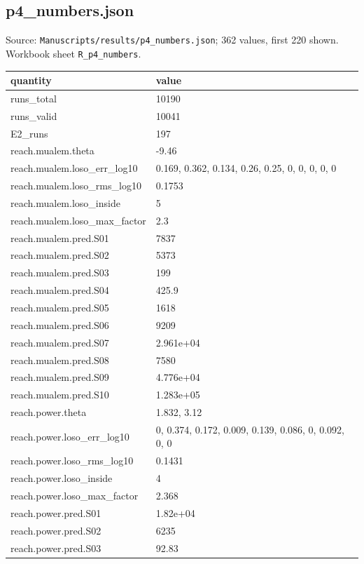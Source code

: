 \subsection*{p4\_numbers.json}
\noindent\small Source: \nolinkurl{Manuscripts/results/p4_numbers.json}; 362 values, first 220 shown. Workbook sheet \texttt{R\_p4\_numbers}.\par
{\scriptsize\begin{longtable}{p{}p{}}\toprule\textbf{quantity} & \textbf{value}\\\midrule\endhead
{}runs\_total & 10190\\
{}runs\_valid & 10041\\
{}E2\_runs & 197\\
{}reach.mualem.theta & -9.46\\
{}reach.mualem.loso\_err\_log10 & 0.169, 0.362, 0.134, 0.26, 0.25, 0, 0, 0, 0, 0\\
{}reach.mualem.loso\_rms\_log10 & 0.1753\\
{}reach.mualem.loso\_inside & 5\\
{}reach.mualem.loso\_max\_factor & 2.3\\
{}reach.mualem.pred.S01 & 7837\\
{}reach.mualem.pred.S02 & 5373\\
{}reach.mualem.pred.S03 & 199\\
{}reach.mualem.pred.S04 & 425.9\\
{}reach.mualem.pred.S05 & 1618\\
{}reach.mualem.pred.S06 & 9209\\
{}reach.mualem.pred.S07 & 2.961e+04\\
{}reach.mualem.pred.S08 & 7580\\
{}reach.mualem.pred.S09 & 4.776e+04\\
{}reach.mualem.pred.S10 & 1.283e+05\\
{}reach.power.theta & 1.832, 3.12\\
{}reach.power.loso\_err\_log10 & 0, 0.374, 0.172, 0.009, 0.139, 0.086, 0, 0.092, 0, 0\\
{}reach.power.loso\_rms\_log10 & 0.1431\\
{}reach.power.loso\_inside & 4\\
{}reach.power.loso\_max\_factor & 2.368\\
{}reach.power.pred.S01 & 1.82e+04\\
{}reach.power.pred.S02 & 6235\\
{}reach.power.pred.S03 & 92.83\\

\end{longtable}}

